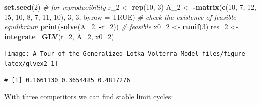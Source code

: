 \documentclass[
]{book}
\newenvironment{Shaded}{\begin{snugshade}}{\end{snugshade}}
\newcommand{\CommentTok}[1]{\textcolor[rgb]{0.56,0.35,0.01}{\textit{#1}}}
\newcommand{\DataTypeTok}[1]{\textcolor[rgb]{0.13,0.29,0.53}{#1}}
\newcommand{\DecValTok}[1]{\textcolor[rgb]{0.00,0.00,0.81}{#1}}
\newcommand{\KeywordTok}[1]{\textcolor[rgb]{0.13,0.29,0.53}{\textbf{#1}}}
\newcommand{\NormalTok}[1]{#1}
\newcommand{\OperatorTok}[1]{\textcolor[rgb]{0.81,0.36,0.00}{\textbf{#1}}}
\newcommand{\OtherTok}[1]{\textcolor[rgb]{0.56,0.35,0.01}{#1}}
\newcommand{\StringTok}[1]{\textcolor[rgb]{0.31,0.60,0.02}{#1}}
\begin{document}
\begin{Shaded}
\begin{Highlighting}[]
\KeywordTok{set.seed}\NormalTok{(}\DecValTok{2}\NormalTok{) }\CommentTok{# for reproducibility}
\NormalTok{r_}\DecValTok{2}\NormalTok{ <-}\StringTok{ }\KeywordTok{rep}\NormalTok{(}\DecValTok{10}\NormalTok{, }\DecValTok{3}\NormalTok{)}
\NormalTok{A_}\DecValTok{2}\NormalTok{ <-}\StringTok{ }\OperatorTok{-}\KeywordTok{matrix}\NormalTok{(}\KeywordTok{c}\NormalTok{(}\DecValTok{10}\NormalTok{, }\DecValTok{7}\NormalTok{, }\DecValTok{12}\NormalTok{, }
                 \DecValTok{15}\NormalTok{, }\DecValTok{10}\NormalTok{, }\DecValTok{8}\NormalTok{, }
                 \DecValTok{7}\NormalTok{, }\DecValTok{11}\NormalTok{, }\DecValTok{10}\NormalTok{), }\DecValTok{3}\NormalTok{, }\DecValTok{3}\NormalTok{, }\DataTypeTok{byrow =} \OtherTok{TRUE}\NormalTok{)}
\CommentTok{# check the existence of feasible equilibrium}
\KeywordTok{print}\NormalTok{(}\KeywordTok{solve}\NormalTok{(A_}\DecValTok{2}\NormalTok{, }\OperatorTok{-}\NormalTok{r_}\DecValTok{2}\NormalTok{)) }\CommentTok{# feasible}
\NormalTok{x0_}\DecValTok{2}\NormalTok{ <-}\StringTok{ }\KeywordTok{runif}\NormalTok{(}\DecValTok{3}\NormalTok{)}
\NormalTok{res_}\DecValTok{2}\NormalTok{ <-}\StringTok{ }\KeywordTok{integrate_GLV}\NormalTok{(r_}\DecValTok{2}\NormalTok{, A_}\DecValTok{2}\NormalTok{, x0_}\DecValTok{2}\NormalTok{)}
\end{Highlighting}
\end{Shaded}

\begin{center}\texttt{[image: A-Tour-of-the-Generalized-Lotka-Volterra-Model\_files/figure-latex/glvex2-1]} \end{center}

\begin{verbatim}
# [1] 0.1661130 0.3654485 0.4817276
\end{verbatim}

With three competitors we can find stable limit cycles:
\end{document}
